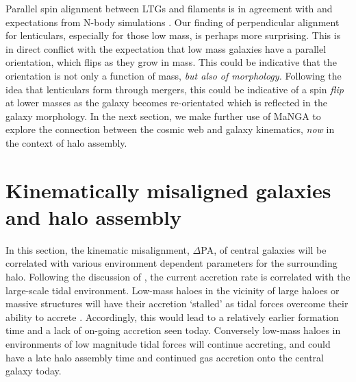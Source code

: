 Parallel spin alignment between LTGs and filaments is in agreement with \cite{welker2020} and expectations from N-body simulations \citep[e.g.][]{laigle2015}. Our finding of perpendicular alignment for lenticulars, especially for those low mass, is perhaps more surprising. This is in direct conflict with the expectation that low mass galaxies have a parallel orientation, which flips as they grow in mass. This could be indicative that the orientation is not only a function of mass, \textit{but also of morphology.} Following the idea that lenticulars form through mergers, this could be indicative of a spin \textit{flip} at lower masses as the galaxy becomes re-orientated which is reflected in the galaxy morphology. In the next section, we make further use of MaNGA to explore the connection between the cosmic web and galaxy kinematics, \textit{now} in the context of halo assembly.

\section{Kinematically misaligned galaxies and halo assembly} \label{sec:halo_assembly}
In this section, the kinematic misalignment, $\Delta$PA, of central galaxies will be correlated with various environment dependent parameters for the surrounding halo. Following the discussion of \citet{hahn2009}, the current accretion rate is correlated with the large-scale tidal environment. Low-mass haloes in the vicinity of large haloes or massive structures will have their accretion `stalled' as tidal forces overcome their ability to accrete \citep[see also;][]{wang2007,dalal2008,lacerna2011}. Accordingly, this would lead to a relatively earlier formation time and a lack of on-going accretion seen today. Conversely low-mass haloes in environments of low magnitude tidal forces will continue accreting, and could have a late halo assembly time and continued gas accretion onto the central galaxy today. 

